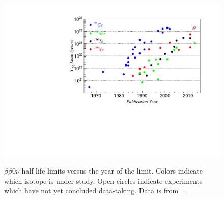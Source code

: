 \begin{figure}
\begin{center}
\includegraphics[keepaspectratio=true,width=\textwidth]{halflife_vs_year.pdf}
\end{center}
\renewcommand{\baselinestretch}{1}
\small\normalsize
\begin{quote}
\caption{$\beta\beta 0\nu$ half-life limits versus the year of the limit.  Colors indicate which isotope is under study.  Open circles indicate experiments which have not yet concluded data-taking.  Data is from ~\cite{
PhysRevC.85.045504,PhysRevLett.110.062502,bb0nSearch2012,PhysRevLett.111.122503,
KlapdorDissent,PhysRevLett.83.41,PhysRevC.59.2108,PhysRevD.65.092007,Andreotti2011822,PhysRevC.78.035502,
PhysRevLett.95.142501,Arnaboldi2004260,Baudis1997219,PhysRevLett.95.182302,NEMO2004,NEMO3-2013-100Mo,
doi:10.1142/S0217732390001475,Bernabei200223,Balysh1994176,0954-3899-17-S-014,Arnaboldi2003167,
1112.0859,Baksan2006Gavriljuk,Luescher1998407,Alessandrello1992176,Alessandrello1994519,Alessandrello1998156,
Alessandrello200013,PhysRevD.48.1009,PhysRevLett.59.419,Bellotti1991193,Bellotti1989209,BellottiMilano1986,
Bellotti1984450,Bellotti198372,BellottiMilano1982,PhysRevD.45.2548,PhysRevC.63.065501,0305-4616-13-6-012,
Ejiri199685,Ejiri199117,PhysRevC.55.474,PhysRevLett.71.831,PhysRevLett.63.1671,Fisher1989257,
PhysRevLett.50.721,PhysRevC.34.666,PhysRevLett.53.141,PhysRevD.51.2090,Forster1984301,PhysRevC.56.2451,
Barabash1989273,Fiorini1967602,Fiorini1973,Barabanov:1986iz,Vasilev:1990gi,PhysRevC.38.895}.}
\label{fig:Halflife_vs_year}
\end{quote}
\end{figure}
\renewcommand{\baselinestretch}{2}
\small\normalsize

